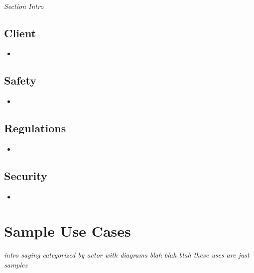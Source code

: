 \documentclass[12pt]{article}
\begin{document}
\paragraph{} \textit{Section Intro}

	\subsection{Client}
	\begin{itemize}
		\item 
	\end{itemize}

	\subsection{Safety}
	\begin{itemize}
		\item 
	\end{itemize}

	\subsection{Regulations}
	\begin{itemize}
		\item 
	\end{itemize}

	\subsection{Security}
	\begin{itemize}
		\item 
	\end{itemize}

\section{Sample Use Cases}
\paragraph{} \textit{intro saying categorized by actor with diagrams blah blah blah these uses are just samples}

\end{document}
